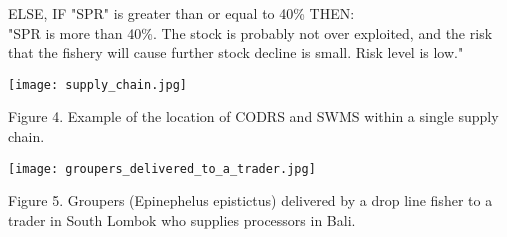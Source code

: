 ELSE, IF "SPR" is greater than or equal to 40\% THEN:\\[0cm]
"SPR is more than 40\%. The stock is probably not over exploited, and the risk that the fishery will cause further stock decline is small. Risk level is low."

\clearpage
\newpage

\begin{center}
\graphicspath{{/root/R-project/IFishGrouper/Images/}}
\texttt{[image: supply\_chain.jpg]}

Figure 4. Example of the location of CODRS and SWMS within a single supply chain.
\end{center}

\begin{center}
\graphicspath{{/root/R-project/IFishGrouper/Images/}}
\texttt{[image: groupers\_delivered\_to\_a\_trader.jpg]}

Figure 5. Groupers (Epinephelus epistictus) delivered by a drop line fisher to a trader in South Lombok who supplies processors in Bali.
\end{center}